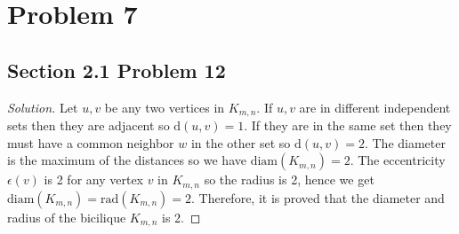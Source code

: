 \documentclass[12pt]{article}
\newenvironment*{solution}{\begin{proof}[Solution]}{\end{proof}}
\begin{document}
\section*{Problem 7}
\subsection*{Section 2.1 Problem 12}
\begin{solution}
    Let \(u,v\) be any two vertices in \(K_{m,n}\). If \(u,v\) are in
    different independent sets then they are adjacent so \(\text{d}(u,v)=1\).
    If they are in the same set then they must have a common neighbor \(w\) in
    the other set so \(\text{d}(u,v)=2\). The diameter is the maximum of the
    distances so we have \(\text{diam}(K_{m,n})=2\). The eccentricity \(
    \epsilon(v)\) is 2 for any vertex \(v\) in \(K_{m,n}\) so the radius is 2,
    hence we get \(\text{diam}(K_{m,n})=\text{rad}(K_{m,n})=2\). Therefore, it
    is proved that the diameter and radius of the bicilique \(K_{m,n}\) is 2.
\end{solution}
\end{document}
